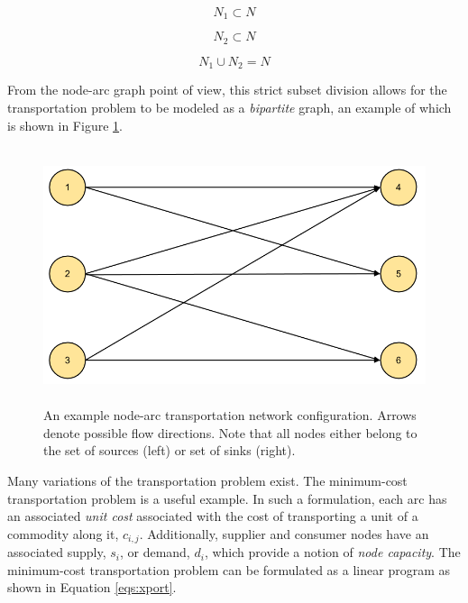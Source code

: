 \begin{equation}
  N_1 \subset N
\end{equation}

\begin{equation}
 N_2 \subset N
\end{equation}

\begin{equation}
  N_1 \cup N_2 = N
\end{equation}

From the node-arc graph point of view, this strict subset division allows for
the transportation problem to be modeled as a \textit{bipartite} graph, an
example of which is shown in Figure \ref{fig:node-arcs-bipartite}.

\begin{figure}[H]
  \begin{center}
    \includegraphics[height=7.5cm]{./chapters/1-intro/figs/node-arcs-bipartite.png}
  \caption{An example node-arc transportation network configuration. Arrows
    denote possible flow directions. Note that all nodes either belong to the 
    set of sources (left) or set of sinks (right).}
  \label{fig:node-arcs-bipartite}
  \end{center}
\end{figure}

Many variations of the transportation problem exist. The minimum-cost
transportation problem is a useful example. In such a formulation, each arc has
an associated \textit{unit cost} associated with the cost of transporting a unit
of a commodity along it, $c_{i,j}$. Additionally, supplier and consumer nodes
have an associated supply, $s_i$, or demand, $d_i$, which provide a notion of
\textit{node capacity}. The minimum-cost transportation problem can be
formulated as a linear program as shown in Equation \ref{eqs:xport}.

